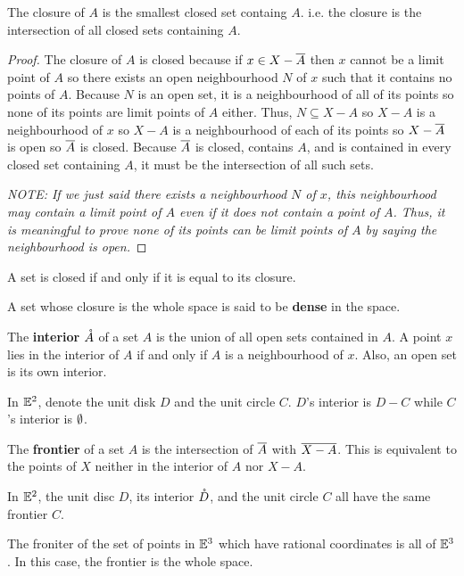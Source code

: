 \begin{theorem}
    The closure of $A$ is the smallest closed set containg $A$. i.e. the closure is the intersection of all closed sets containing $A$.
\end{theorem}
\begin{proof}
    The closure of $A$ is closed because if $x \in X-\overline{A}$ then $x$ cannot be a limit point of $A$ so there exists an open neighbourhood $N$ of $x$ such that it contains no points of $A$. Because $N$ is an open set, it is a neighbourhood of all of its points so none of its points are limit points of $A$ either. Thus, $N \subseteq X-A$ so $X-A$ is a neighbourhood of $x$ so $X-A$ is a neighbourhood of each of its points so $X-\overline{A}$ is open so $\overline{A}$ is closed. Because $\overline{A}$ is closed, contains $A$, and is contained in every closed set containing $A$, it must be the intersection of all such sets.

    \emph{NOTE: If we just said there exists a neighbourhood $N$ of $x$, this neighbourhood may contain a limit point of $A$ even if it does not contain a point of $A$. Thus, it is meaningful to prove none of its points can be limit points of $A$ by saying the neighbourhood is open.}
\end{proof}
\begin{corollary}
    A set is closed if and only if it is equal to its closure.
\end{corollary}
\begin{definition}[Dense]
    A set whose closure is the whole space is said to be \textbf{dense} in the space.
\end{definition}
\begin{definition}[Interior]
    The \textbf{interior} $\mathring{A}$ of a set $A$ is the union of all open sets contained in $A$. A point $x$ lies in the interior of $A$ if and only if $A$ is a neighbourhood of $x$. Also, an open set is its own interior.
\end{definition}
\begin{example}
    In $\mathbb{E}^2$, denote the unit disk $D$ and the unit circle $C$. $D$'s interior is $D-C$ while $C$'s interior is $\emptyset$. 
\end{example}
\begin{definition}[Frontier]
    The \textbf{frontier} of a set $A$ is the intersection of $\overline{A}$ with $\overline{X-A}$. This is equivalent to the points of $X$ neither in the interior of $A$ nor $X-A$.
\end{definition}
\begin{example}
    In $\mathbb{E}^2$, the unit disc $D$, its interior $\mathring{D}$, and the unit circle $C$ all have the same frontier $C$.

    The froniter of the set of points in $\mathbb{E}^3$ which have rational coordinates is all of $\mathbb{E}^3$. In this case, the frontier is the whole space.
\end{example}
